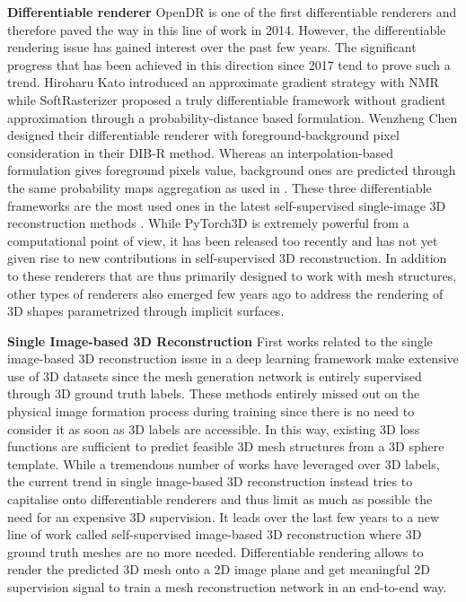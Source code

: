 \noindent\textbf{Differentiable renderer} OpenDR \citep{loper2014opendr} is one of the first differentiable renderers and therefore paved the way in this line of work in 2014. However, the differentiable rendering issue has gained interest over the past few years. The significant progress that has been achieved in this direction since 2017 tend to prove such a trend. Hiroharu Kato \etal introduced an approximate gradient strategy with NMR\citep{kato2018neural} while SoftRasterizer\citep{liu2019soft} proposed a truly differentiable framework without gradient approximation through a probability-distance based formulation. Wenzheng Chen \etal designed their differentiable renderer with foreground-background pixel consideration in their DIB-R \citep{chen2019learning} method. Whereas an interpolation-based formulation gives foreground pixels value, background ones are predicted through the same probability maps aggregation as used in \citep{liu2019soft}. These three differentiable frameworks are the most used ones in the latest self-supervised single-image 3D reconstruction methods \citep{kanazawa2018learning,li2020self,pavllo2020convolutional}. While PyTorch3D \citep{ravi2020accelarating} is extremely powerful from a computational point of view, it has been released too recently and has not yet given rise to new contributions in self-supervised 3D reconstruction. In addition to these renderers that are thus primarily designed to work with mesh structures, other types of renderers\citep{niemeyer2020differentiable,jiang2020sdfdiff} also emerged few years ago to address the rendering of 3D shapes parametrized through implicit surfaces. 

\noindent\textbf{Single Image-based 3D Reconstruction} First works related to the single image-based 3D reconstruction issue in a deep learning framework \citep{choy20163d,girdhar2016learning,yang2018dense} make extensive use of 3D datasets \citep{chang2015shapenet,sun2018pix3d} since the mesh generation network is entirely supervised through 3D ground truth labels. These methods entirely missed out on the physical image formation process during training since there is no need to consider it as soon as 3D labels are accessible. In this way, existing 3D loss functions are sufficient to predict feasible 3D mesh structures from a 3D sphere template. While a tremendous number of works have leveraged over 3D labels, the current trend in single image-based 3D reconstruction instead tries to capitalise onto differentiable renderers and thus limit as much as possible the need for an expensive 3D supervision. It leads over the last few years to a new line of work called self-supervised image-based 3D reconstruction  \citep{kanazawa2018learning,li2020self,pavllo2020convolutional,henderson2020leveraging} where 3D ground truth meshes are no more needed. Differentiable rendering allows to render the predicted 3D mesh onto a 2D image plane and get meaningful 2D supervision signal to train a mesh reconstruction network in an end-to-end way. 

